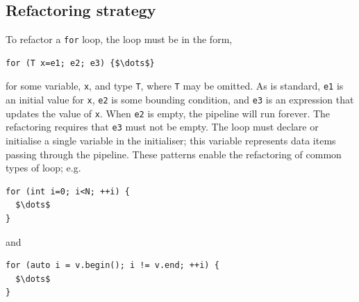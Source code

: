 %

\subsection{Refactoring strategy}\label{refactoring-strategy}

To refactor a \texttt{for} loop, the loop must be in the form,
% 
\begin{lstlisting}[mathescape]
for (T x=e1; e2; e3) {$\dots$}
\end{lstlisting}

\noindent
for some variable, \texttt{x}, and type \texttt{T}, where \texttt{T} may be omitted.
As is standard,
\texttt{e1} is an initial value for \texttt{x}, \texttt{e2} is some
bounding condition, and \texttt{e3} is an expression that updates the
value of \texttt{x}. When \texttt{e2} is empty, the
pipeline will run forever. The refactoring requires that \texttt{e3} must not be empty. The
loop must declare or initialise a
single variable in the initialiser; this variable represents data
items passing through the pipeline.
% 
These patterns enable the refactoring of common types of loop; e.g.
\begin{lstlisting}[mathescape]
for (int i=0; i<N; ++i) {
  $\dots$
}
\end{lstlisting}

\noindent
and
\begin{lstlisting}[mathescape]
for (auto i = v.begin(); i != v.end; ++i) {
  $\dots$
}
\end{lstlisting}

